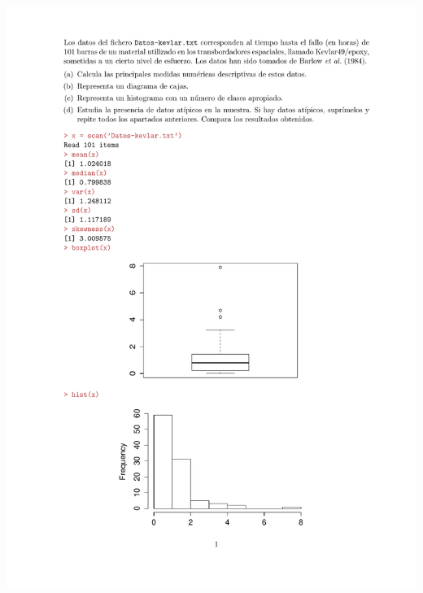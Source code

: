 \begin{problem}[4]
\solution
\centerline{\includegraphics[page=1,scale=0.77]{pdf/_Solucion_T1P4.pdf}} %

\end{problem}
\newpage

